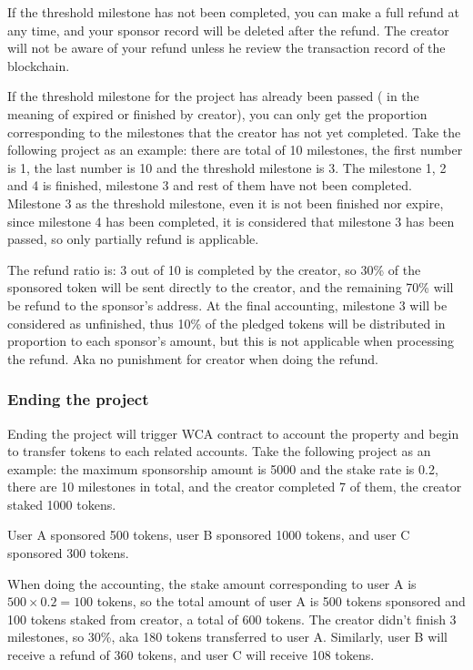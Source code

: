 \documentclass[12pt,a4paper]{article}
\begin{document}
    If the threshold milestone has not been completed, you can make a
    full refund at any time, and your sponsor record will be deleted
    after the refund. The creator will not be aware of your refund unless
    he review the transaction record of the blockchain.

    If the threshold milestone for the project has already been passed (
    in the meaning of expired or finished by creator),
    you can only get the proportion corresponding to the milestones that
    the creator has not yet completed. Take the following project as an example:
    there are total of 10 milestones, the first number is 1, the last number is 10 and
    the threshold milestone is 3. The milestone 1, 2 and 4 is finished,
    milestone 3 and rest of them have not been completed. Milestone 3 as the
    threshold milestone, even it is not been finished nor expire, since milestone 4
    has been completed, it is considered that milestone 3 has been passed,
    so only partially refund is applicable.

    The refund ratio is: 3 out of 10 is completed by the creator,
    so 30\% of the sponsored token will be sent directly to the creator,
    and the remaining 70\% will be refund to the sponsor's address.
    At the final accounting, milestone 3 will be considered as unfinished,
    thus 10\% of the pledged tokens will be distributed in proportion to
    each sponsor's amount, but this is not applicable when processing the
    refund. Aka no punishment for creator when doing the refund.

    \subsubsection{Ending the project}

    Ending the project will trigger WCA contract to account the property
    and begin to transfer tokens to each related accounts. Take the
    following project as an example: the maximum sponsorship amount
    is 5000 and the stake rate is 0.2, there are 10 milestones
    in total, and the creator completed 7 of them, the creator staked 1000 tokens.

    User A sponsored 500 tokens, user B sponsored 1000 tokens, and user C sponsored 300 tokens.

    When doing the accounting, the stake amount corresponding to user A
    is $500 \times 0.2 = 100$ tokens, so the total amount of user A is
    500 tokens sponsored and 100 tokens staked from creator, a total of 600 tokens.
    The creator didn't finish 3 milestones, so 30\%, aka 180 tokens transferred to user A.
    Similarly, user B will receive a refund of 360 tokens, and user C will receive 108 tokens.
\end{document}
